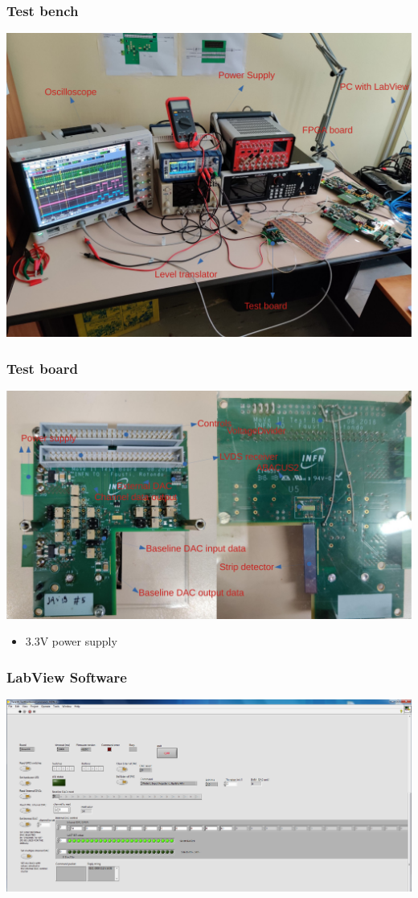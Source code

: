 \documentclass[aspectratio=169]{beamer}
\begin{document}
	\begin{frame}
	\frametitle{Test bench}
	\begin{center}
		\includegraphics[width=0.65 \textwidth]{IMG/TestBench.pdf}
	\end{center}
	\end{frame}

	\begin{frame}
	\frametitle{Test board}
	\begin{center}
		\includegraphics[width=0.7 \textwidth]{IMG/TestBoard.pdf}
	\end{center}
	\begin{itemize}
		\item 3.3V power supply
	\end{itemize}
	\end{frame}

	\begin{frame}
	\frametitle{LabView Software}
	\begin{center}
		\includegraphics[width=0.8 \textwidth]{IMG/LabVIEWBaselineDac.PNG}
	\end{center}
	
	\end{frame}
\end{document}
